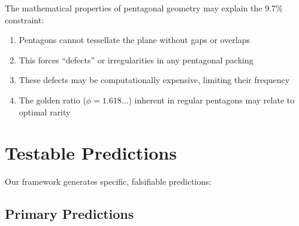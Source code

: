 \documentclass[mlmain]{jmlr}
\begin{document}
The mathematical properties of pentagonal geometry may explain the 9.7\% constraint:

\begin{enumerate}
\item Pentagons cannot tessellate the plane without gaps or overlaps
\item This forces ``defects'' or irregularities in any pentagonal packing
\item These defects may be computationally expensive, limiting their frequency
\item The golden ratio ($\phi = 1.618...$) inherent in regular pentagons may relate to optimal rarity
\end{enumerate}

\section{Testable Predictions}

Our framework generates specific, falsifiable predictions:

\subsection{Primary Predictions}
\end{document}
